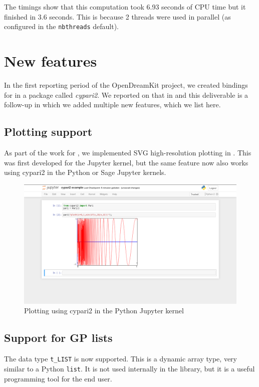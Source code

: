 \documentclass{deliverablereport}
\begin{document}
The timings show that this computation took 6.93 seconds of CPU time
but it finished in 3.6 seconds.
This is because 2 threads were used in parallel
(as configured in the \texttt{nbthreads} default).

\section{New features}

In the first reporting period of the OpenDreamKit project,
we created \Python bindings for \PariGP in a package called \emph{cypari2}.
We reported on that in  and this deliverable is a follow-up
in which we added multiple new features, which we list here.

\subsection{Plotting support}

As part of the work for ,
we implemented SVG high-resolution plotting in \Pari.
This was first developed for the \PariGP Jupyter kernel,
but the same feature now also works using cypari2
in the Python or Sage Jupyter kernels.

\begin{figure}[ht]
  \includegraphics[width=\textwidth,trim={60px 100px 60px 1px},clip]{jupyter-cypari2.png}
  \caption{Plotting using cypari2 in the Python Jupyter kernel}
\end{figure}

\subsection{Support for GP lists}

The \PariGP data type \verb/t_LIST/ is now supported.
This is a dynamic array type, very similar to a Python \verb/list/.
It is not used internally in the \Pari library,
but it is a useful programming tool for the end user.
\end{document}
